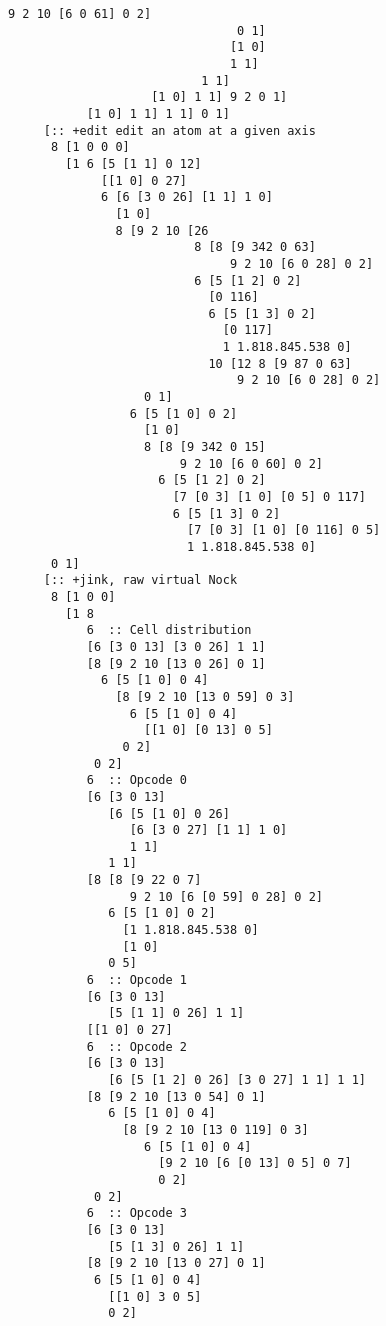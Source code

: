\documentclass[twoside]{article}
\begin{document}
\begin{lstlisting}[style=listingcode]
                                 9 2 10 [6 0 61] 0 2]
                                0 1]
                               [1 0]
                               1 1]
                           1 1]
                    [1 0] 1 1] 9 2 0 1]
           [1 0] 1 1] 1 1] 0 1]
     [:: +edit edit an atom at a given axis
      8 [1 0 0 0]
        [1 6 [5 [1 1] 0 12]
             [[1 0] 0 27]
             6 [6 [3 0 26] [1 1] 1 0]
               [1 0]
               8 [9 2 10 [26
                          8 [8 [9 342 0 63]
                               9 2 10 [6 0 28] 0 2]
                          6 [5 [1 2] 0 2]
                            [0 116]
                            6 [5 [1 3] 0 2]
                              [0 117]
                              1 1.818.845.538 0]
                            10 [12 8 [9 87 0 63]
                                9 2 10 [6 0 28] 0 2]
                   0 1]
                 6 [5 [1 0] 0 2]
                   [1 0]
                   8 [8 [9 342 0 15]
                        9 2 10 [6 0 60] 0 2]
                     6 [5 [1 2] 0 2]
                       [7 [0 3] [1 0] [0 5] 0 117]
                       6 [5 [1 3] 0 2]
                         [7 [0 3] [1 0] [0 116] 0 5]
                         1 1.818.845.538 0]
      0 1]
     [:: +jink, raw virtual Nock
      8 [1 0 0]
        [1 8
           6  :: Cell distribution
           [6 [3 0 13] [3 0 26] 1 1]
           [8 [9 2 10 [13 0 26] 0 1]
             6 [5 [1 0] 0 4]
               [8 [9 2 10 [13 0 59] 0 3]
                 6 [5 [1 0] 0 4]
                   [[1 0] [0 13] 0 5]
                0 2]
            0 2]
           6  :: Opcode 0
           [6 [3 0 13]
              [6 [5 [1 0] 0 26]
                 [6 [3 0 27] [1 1] 1 0]
                 1 1]
              1 1]
           [8 [8 [9 22 0 7]
                 9 2 10 [6 [0 59] 0 28] 0 2]
              6 [5 [1 0] 0 2]
                [1 1.818.845.538 0]
                [1 0]
              0 5]
           6  :: Opcode 1
           [6 [3 0 13]
              [5 [1 1] 0 26] 1 1]
           [[1 0] 0 27]
           6  :: Opcode 2
           [6 [3 0 13]
              [6 [5 [1 2] 0 26] [3 0 27] 1 1] 1 1]
           [8 [9 2 10 [13 0 54] 0 1]
              6 [5 [1 0] 0 4]
                [8 [9 2 10 [13 0 119] 0 3]
                   6 [5 [1 0] 0 4]
                     [9 2 10 [6 [0 13] 0 5] 0 7]
                     0 2]
            0 2]
           6  :: Opcode 3
           [6 [3 0 13]
              [5 [1 3] 0 26] 1 1]
           [8 [9 2 10 [13 0 27] 0 1]
            6 [5 [1 0] 0 4]
              [[1 0] 3 0 5]
              0 2]

\end{lstlisting}
\end{document}
